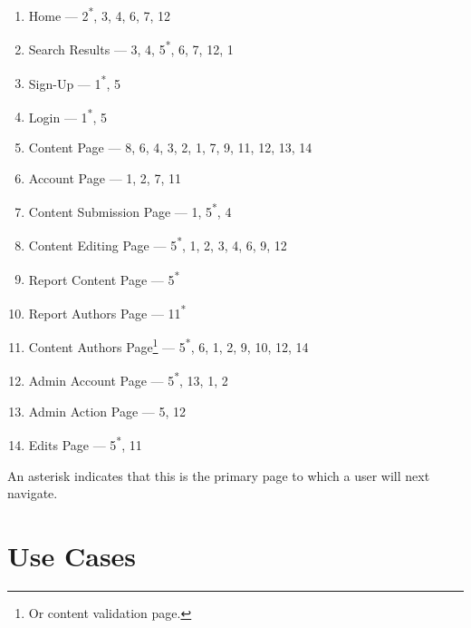 \documentclass[12pt,letterpaper]{article}
\begin{document}
\begin{enumerate}
\item[1.] Home --- 2\textsuperscript{*}, 3, 4, 6, 7, 12
\item[2.] Search Results --- 3, 4, 5\textsuperscript{*}, 6, 7, 12, 1
\item[3.] Sign-Up --- 1\textsuperscript{*}, 5
\item[4.] Login --- 1\textsuperscript{*}, 5
\item[5.] Content Page --- 8, 6, 4, 3, 2, 1, 7, 9, 11, 12, 13, 14
\item[6.] Account Page  --- 1, 2, 7, 11
\item[7.] Content Submission Page --- 1, 5\textsuperscript{*}, 4
\item[8.] Content Editing Page --- 5\textsuperscript{*}, 1, 2, 3, 4, 6, 9, 12
\item[9.] Report Content Page --- 5\textsuperscript{*}
\item[10.] Report Authors Page --- 11\textsuperscript{*}
\item[11.] Content Authors Page\footnote{Or content validation page.} --- 5\textsuperscript{*}, 6, 1, 2, 9, 10, 12, 14
\item[12.] Admin Account Page --- 5\textsuperscript{*}, 13, 1, 2
\item[13.] Admin Action Page --- 5, 12
\item[14.] Edits Page --- 5\textsuperscript{*}, 11
\end{enumerate}

An asterisk indicates that this is the primary page to which a user will next navigate. 



\section{Use Cases}
\end{document}
